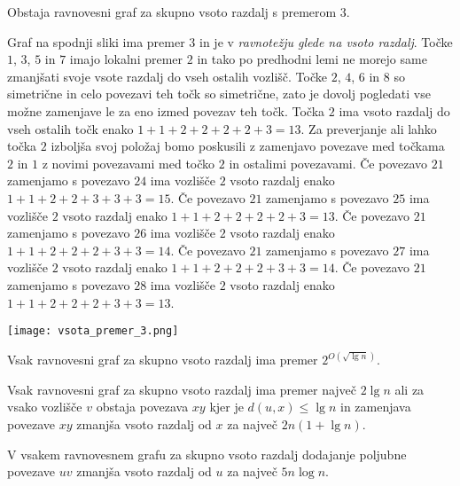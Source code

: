 \documentclass[fin1, tisk]{fmfdelo}
\begin{document}
\begin{dokaz}

\end{dokaz}


\begin{izrek}
Obstaja ravnovesni graf za skupno vsoto razdalj s premerom $3$.
\end{izrek}

\begin{dokaz}
Graf na spodnji sliki ima premer $3$ in je v \textit{ravnotežju glede na vsoto razdalj}.
Točke $1$, $3$, $5$ in $7$ imajo lokalni premer $2$ in tako po predhodni lemi ne
morejo same zmanjšati svoje vsote razdalj do vseh ostalih vozlišč. Točke $2$, $4$,
$6$ in $8$ so simetrične in celo povezavi teh točk so simetrične, zato je dovolj
pogledati vse možne zamenjave le za eno izmed povezav teh točk. Točka $2$ ima
vsoto razdalj do vseh ostalih točk enako $1 + 1 + 2 + 2 + 2 + 2 + 3 = 13$. Za
preverjanje ali lahko točka $2$ izboljša svoj položaj bomo poskusili z zamenjavo
povezave med točkama $2$ in $1$ z novimi povezavami med točko $2$ in ostalimi povezavami.
Če povezavo $21$ zamenjamo s povezavo $24$ ima vozlišče $2$ vsoto razdalj enako
$1 + 1 + 2 + 2 + 3 + 3 + 3 = 15$. Če povezavo $21$ zamenjamo s povezavo $25$ ima
vozlišče $2$ vsoto razdalj enako $1 + 1 + 2 + 2 + 2 + 2 + 3 = 13$. Če povezavo $21$
zamenjamo s povezavo $26$ ima vozlišče $2$ vsoto razdalj enako
$1 + 1 + 2 + 2 + 2 + 3 + 3 = 14$. Če povezavo $21$ zamenjamo s povezavo $27$ ima
vozlišče $2$ vsoto razdalj enako $1 + 1 + 2 + 2 + 2 + 3 + 3 = 14$. Če povezavo $21$
zamenjamo s povezavo $28$ ima vozlišče $2$ vsoto razdalj enako
$1 + 1 + 2 + 2 + 2 + 3 + 3 = 13$.
\end{dokaz}

\texttt{[image: vsota\_premer\_3.png]}

\begin{izrek}
Vsak ravnovesni graf za skupno vsoto razdalj ima premer $2^{O(\sqrt{\lg n})}$.
\end{izrek}

\begin{lema}
Vsak ravnovesni graf za skupno vsoto razdalj ima premer največ $2 \lg n$ ali
za vsako vozlišče $v$ obstaja povezava $xy$ kjer je $d(u, x) \leq \lg n$ in
zamenjava povezave $xy$ zmanjša vsoto razdalj od $x$ za največ $2n(1 + \lg n)$.
\end{lema}

\begin{lema}
V vsakem ravnovesnem grafu za skupno vsoto razdalj dodajanje poljubne povezave
$uv$ zmanjša vsoto razdalj od $u$ za največ $5n \log n$.
\end{lema}
\end{document}
